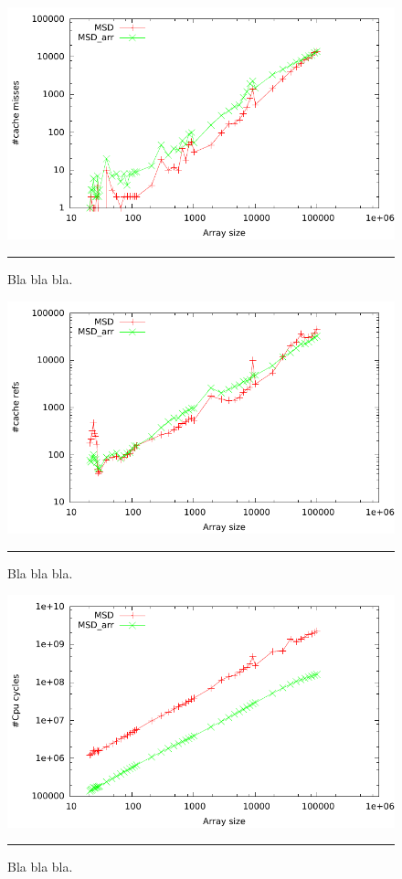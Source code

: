 \begin{figure}[htbp]
	\centering
		\includegraphics[width=\textwidth]{./Figures/Project2b/Cache_misses.pdf}
		\rule{35em}{0.5pt}
	\caption[Cache misses]{
	Bla bla bla.
	}
	\label{fig:Cache_misses_p2b}
\end{figure}



\begin{figure}[htbp]
	\centering
		\includegraphics[width=\textwidth]{./Figures/Project2b/Cache_refs.pdf}
		\rule{35em}{0.5pt}
	\caption[Cache refs]{
	Bla bla bla.
	}
	\label{fig:Cache_refs_p2b}
\end{figure}



\begin{figure}[htbp]
	\centering
		\includegraphics[width=\textwidth]{./Figures/Project2b/Cpu_cycles.pdf}
		\rule{35em}{0.5pt}
	\caption[CPU cycles]{
	Bla bla bla.
	}
	\label{fig:Cpu_cycles_p2b}
\end{figure}


